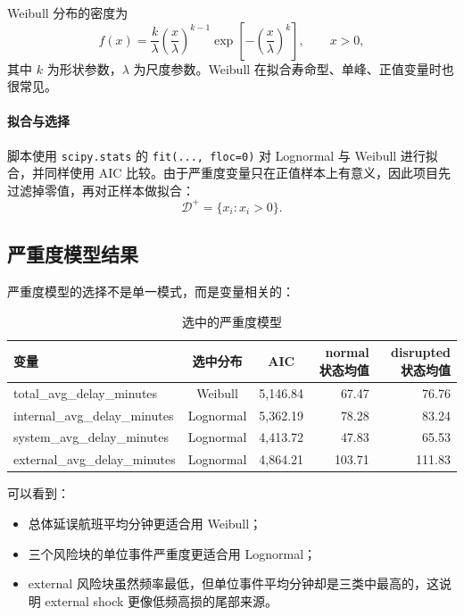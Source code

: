 Weibull 分布的密度为
\begin{equation}
f(x) = \frac{k}{\lambda}
\left(\frac{x}{\lambda}\right)^{k-1}
\exp\left[-\left(\frac{x}{\lambda}\right)^k\right], \qquad x>0,
\end{equation}
其中 $k$ 为形状参数，$\lambda$ 为尺度参数。Weibull 在拟合寿命型、单峰、正值变量时也很常见。

\paragraph{拟合与选择}

脚本使用 \texttt{scipy.stats} 的 \texttt{fit(..., floc=0)} 对 Lognormal 与 Weibull 进行拟合，并同样使用 AIC 比较。由于严重度变量只在正值样本上有意义，因此项目先过滤掉零值，再对正样本做拟合：
\begin{equation}
\mathcal{D}^{+} = \{x_i : x_i > 0\}.
\end{equation}

\subsection{严重度模型结果}

严重度模型的选择不是单一模式，而是变量相关的：
\begin{table}[H]
\centering
\caption{选中的严重度模型}
\begin{tabular}{lccrr}
\toprule
变量 & 选中分布 & AIC & normal 状态均值 & disrupted 状态均值 \\
\midrule
total\_avg\_delay\_minutes & Weibull & 5{,}146.84 & 67.47 & 76.76 \\
internal\_avg\_delay\_minutes & Lognormal & 5{,}362.19 & 78.28 & 83.24 \\
system\_avg\_delay\_minutes & Lognormal & 4{,}413.72 & 47.83 & 65.53 \\
external\_avg\_delay\_minutes & Lognormal & 4{,}864.21 & 103.71 & 111.83 \\
\bottomrule
\end{tabular}
\end{table}

可以看到：
\begin{itemize}[leftmargin=2.2em]
  \item 总体延误航班平均分钟更适合用 Weibull；
  \item 三个风险块的单位事件严重度更适合用 Lognormal；
  \item external 风险块虽然频率最低，但单位事件平均分钟却是三类中最高的，这说明 external shock 更像低频高损的尾部来源。
\end{itemize}

